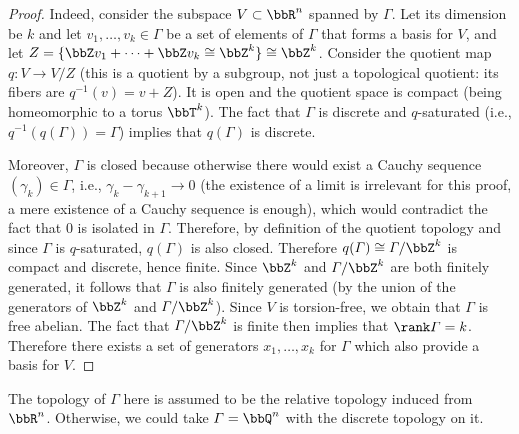 \begin{proof}
    Indeed, consider the subspace $V\subset \bbR^n$ spanned by $\varGamma$. Let its dimension be $k$ and let $v_1,\ldots,v_k\in \varGamma$ be a set of elements of $\varGamma$ that forms a basis for $V$, and let $Z=\{\bbZ v_1+\cdots +\bbZ v_k\cong \bbZ^k\}\cong\bbZ^k$. Consider the quotient map $q:V\to V/Z$ (this is a quotient by a subgroup, not just a topological quotient: its fibers are $q^{-1}(v)=v+Z$). It is open and the quotient space is compact (being homeomorphic to a torus $\bbT^k$). The fact that $\varGamma$ is discrete and $q$-saturated (i.e., $q^{-1}(q(\varGamma))=\varGamma$) implies that $q(\varGamma)$ is discrete. 
    
    Moreover, $\varGamma$ is closed because otherwise there would exist a Cauchy sequence $(\gamma_k)\in\varGamma$, i.e., $\gamma_k-\gamma_{k+1}\to 0$ (the existence of a limit is irrelevant for this proof, a mere existence of a Cauchy sequence is enough), which would contradict the fact that $0$ is isolated in $\varGamma$. Therefore, by definition of the quotient topology and since $\varGamma$ is $q$-saturated, $q(\varGamma)$ is also closed.  Therefore $q(\varGamma)\cong \varGamma\slash \bbZ^k$ is compact and discrete, hence finite. Since $\bbZ^k$ and $\varGamma\slash \bbZ^k$ are both finitely generated, it follows that $\varGamma$ is also finitely generated (by the union of the generators of $\bbZ^k$ and $\varGamma\slash \bbZ^k$). Since $V$ is torsion-free, we obtain that $\varGamma$ is free abelian.  The fact that $\varGamma\slash \bbZ^k$ is finite then implies that $\rank \varGamma=k$. Therefore there exists a set of generators $x_1,\ldots,x_k$ for $\varGamma$ which also provide a basis for $V$.
\end{proof}

\begin{rem}
    The topology of $\varGamma$ here is assumed to be the relative topology induced from $\bbR^n$. Otherwise, we could take $\varGamma=\bbQ^n$ with the discrete topology on it.
\end{rem}


